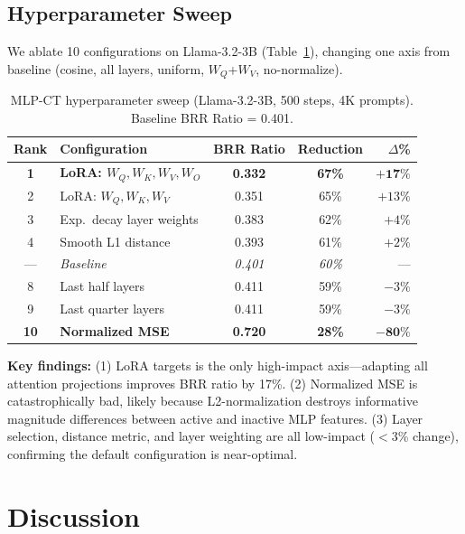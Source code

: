 \documentclass[12pt, letterpaper]{article}
\begin{document}
\subsection{Hyperparameter Sweep}

We ablate 10 configurations on Llama-3.2-3B (Table~\ref{tab:sweep}), changing one axis from baseline (cosine, all layers, uniform, $W_Q$+$W_V$, no-normalize).

\begin{table}[h]
\centering
\small
\caption{MLP-CT hyperparameter sweep (Llama-3.2-3B, 500 steps, 4K prompts). Baseline BRR Ratio = 0.401.}
\label{tab:sweep}
\begin{tabular}{clccr}
\toprule
\textbf{Rank} & \textbf{Configuration} & \textbf{BRR Ratio} & \textbf{Reduction} & \textbf{$\Delta$\%} \\
\midrule
\textbf{1} & \textbf{LoRA: $W_Q, W_K, W_V, W_O$} & \textbf{0.332} & \textbf{67\%} & $\mathbf{+17\%}$ \\
2 & LoRA: $W_Q, W_K, W_V$ & 0.351 & 65\% & $+13\%$ \\
3 & Exp.\ decay layer weights & 0.383 & 62\% & $+4\%$ \\
4 & Smooth L1 distance & 0.393 & 61\% & $+2\%$ \\
\midrule
--- & \textit{Baseline} & \textit{0.401} & \textit{60\%} & --- \\
\midrule
8 & Last half layers & 0.411 & 59\% & $-3\%$ \\
9 & Last quarter layers & 0.411 & 59\% & $-3\%$ \\
\textbf{10} & \textbf{Normalized MSE} & \textbf{0.720} & \textbf{28\%} & $\mathbf{-80\%}$ \\
\bottomrule
\end{tabular}
\end{table}

\textbf{Key findings:} (1) LoRA targets is the only high-impact axis---adapting all attention projections improves BRR ratio by 17\%. (2) Normalized MSE is catastrophically bad, likely because L2-normalization destroys informative magnitude differences between active and inactive MLP features. (3) Layer selection, distance metric, and layer weighting are all low-impact ($<$3\% change), confirming the default configuration is near-optimal.

\section{Discussion}
\end{document}
